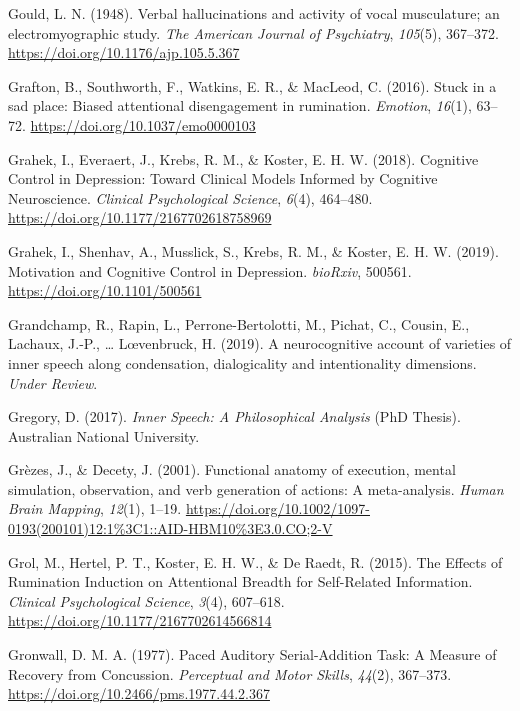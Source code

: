 \documentclass[a4paper,12pt,twoside,openright,oldfontcommands,final]{memoir}
\begin{document}
\leavevmode\hypertarget{ref-gould_verbal_1948}{}%
Gould, L. N. (1948). Verbal hallucinations and activity of vocal musculature; an electromyographic study. \emph{The American Journal of Psychiatry}, \emph{105}(5), 367--372. \url{https://doi.org/10.1176/ajp.105.5.367}

\leavevmode\hypertarget{ref-grafton_stuck_2016}{}%
Grafton, B., Southworth, F., Watkins, E. R., \& MacLeod, C. (2016). Stuck in a sad place: Biased attentional disengagement in rumination. \emph{Emotion}, \emph{16}(1), 63--72. \url{https://doi.org/10.1037/emo0000103}

\leavevmode\hypertarget{ref-grahek_cognitive_2018}{}%
Grahek, I., Everaert, J., Krebs, R. M., \& Koster, E. H. W. (2018). Cognitive Control in Depression: Toward Clinical Models Informed by Cognitive Neuroscience. \emph{Clinical Psychological Science}, \emph{6}(4), 464--480. \url{https://doi.org/10.1177/2167702618758969}

\leavevmode\hypertarget{ref-grahek_motivation_2019}{}%
Grahek, I., Shenhav, A., Musslick, S., Krebs, R. M., \& Koster, E. H. W. (2019). Motivation and Cognitive Control in Depression. \emph{bioRxiv}, 500561. \url{https://doi.org/10.1101/500561}

\leavevmode\hypertarget{ref-grandchamp_neurocognitive_2019}{}%
Grandchamp, R., Rapin, L., Perrone-Bertolotti, M., Pichat, C., Cousin, E., Lachaux, J.-P., \ldots{} Lœvenbruck, H. (2019). A neurocognitive account of varieties of inner speech along condensation, dialogicality and intentionality dimensions. \emph{Under Review}.

\leavevmode\hypertarget{ref-gregory_inner_2017}{}%
Gregory, D. (2017). \emph{Inner Speech: A Philosophical Analysis} (PhD Thesis). Australian National University.

\leavevmode\hypertarget{ref-grezes_functional_2001}{}%
Grèzes, J., \& Decety, J. (2001). Functional anatomy of execution, mental simulation, observation, and verb generation of actions: A meta-analysis. \emph{Human Brain Mapping}, \emph{12}(1), 1--19. \url{https://doi.org/10.1002/1097-0193(200101)12:1\%3C1::AID-HBM10\%3E3.0.CO;2-V}

\leavevmode\hypertarget{ref-grol_effects_2015}{}%
Grol, M., Hertel, P. T., Koster, E. H. W., \& De Raedt, R. (2015). The Effects of Rumination Induction on Attentional Breadth for Self-Related Information. \emph{Clinical Psychological Science}, \emph{3}(4), 607--618. \url{https://doi.org/10.1177/2167702614566814}

\leavevmode\hypertarget{ref-gronwall_paced_1977}{}%
Gronwall, D. M. A. (1977). Paced Auditory Serial-Addition Task: A Measure of Recovery from Concussion. \emph{Perceptual and Motor Skills}, \emph{44}(2), 367--373. \url{https://doi.org/10.2466/pms.1977.44.2.367}
\end{document}
